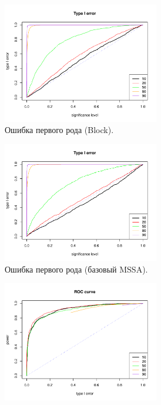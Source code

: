 \documentclass[specialist,
substylefile = spbu_report.rtx,
subf,href,colorlinks=true, 12pt]{disser}
\theoremstyle{definition}
\begin{document}
	\begin{figure}
	\captionsetup[subfigure]{justification=Centering}
	\begin{subfigure}[t]{0.45\textwidth}
		\centering
		\includegraphics[width=0.75\textwidth]{img/type1error_block_ev.pdf}
		\caption{Ошибка первого рода (Block).}
		\label{fig:block_ev_a}
	\end{subfigure}\hspace{\fill}
	\begin{subfigure}[t]{0.45\textwidth}
		\centering
		\includegraphics[width=0.75\textwidth]{img/type1error_mssa_ev.pdf}
		\caption{Ошибка первого рода (базовый MSSA).}
	\end{subfigure}
	\bigskip
	\begin{subfigure}[t]{0.45\textwidth}
		\centering
		\includegraphics[width=0.75\textwidth]{img/roc_block_ev.pdf}

\end{subfigure}
\end{figure}
\end{document}
